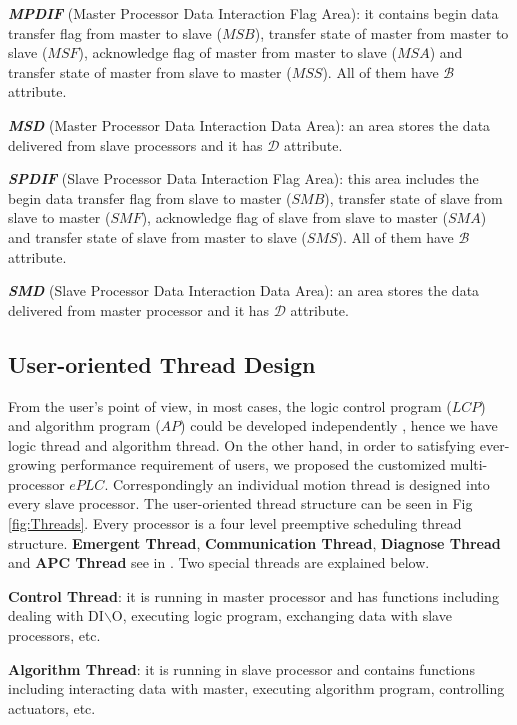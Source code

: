 \documentclass[journal,UTF8]{IEEEtran}
\begin{document}
\textbf{\emph{MPDIF}} (Master Processor Data Interaction Flag Area): it contains begin data transfer flag from master to slave ($MSB$), transfer state of master from master to slave ($MSF$), acknowledge flag of master from master to slave ($MSA$) and transfer state of master from slave to master ($MSS$). All of them have $\mathcal{B}$ attribute.

\textbf{\emph{MSD}} (Master Processor Data Interaction Data Area): an area stores the data delivered from slave processors and it has $\mathcal{D}$ attribute.

\textbf{\emph{SPDIF}} (Slave Processor Data Interaction Flag Area): this area includes the begin data transfer flag from slave to master ($SMB$), transfer state of slave from slave to master ($SMF$), acknowledge flag of slave from slave to master ($SMA$) and transfer state of slave from master to slave ($SMS$). All of them have $\mathcal{B}$ attribute.

\textbf{\emph{SMD}} (Slave Processor Data Interaction Data Area): an area stores the data delivered from master processor and it has $\mathcal{D}$ attribute.

\subsection{User-oriented Thread Design}
From the user's point of view, in most cases, the logic control program ($LCP$) and algorithm program ($AP$) could be developed independently \cite{WuA}, hence we have logic thread and algorithm thread. On the other hand, in order to satisfying ever-growing performance requirement of users, we proposed the customized multi-processor $ePLC$. Correspondingly an individual motion thread is designed into every slave processor. The user-oriented thread structure can be seen in Fig \ref{fig:Threads}. Every processor is a four level preemptive scheduling thread structure. \textbf{Emergent Thread}, \textbf{Communication Thread}, \textbf{Diagnose Thread} and \textbf{APC Thread} see in \cite{WuA}. Two special threads are explained below.

\textbf{Control Thread}: it is running in master processor and has functions including dealing with DI$\backslash$O, executing logic program, exchanging data with slave processors, etc.

\textbf{Algorithm Thread}: it is running in slave processor and contains functions including interacting data with master, executing algorithm program, controlling actuators, etc.
\end{document}
